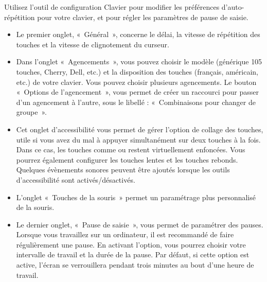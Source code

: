 {}
Utilisez l'outil de configuration Clavier pour modifier les préférences d'auto-répétition pour votre clavier, et pour régler les paramètres de pause de saisie.
\begin{itemize}
\item Le premier onglet, «~Général~», concerne le délai, la vitesse de répétition des touches et la vitesse de clignotement du curseur.
\item Dans l'onglet «~Agencements~», vous pouvez choisir le modèle (générique 105 touches, Cherry, Dell, etc.) et la disposition des touches (français, américain, etc.) de votre clavier. Vous pouvez choisir plusieurs agencements. Le bouton «~Options de l'agencement~», vous permet de créer un raccourci pour passer d'un agencement à l'autre, sous le libellé : «~Combinaisons pour changer de groupe~».
\item Cet onglet d'accessibilité vous permet de gérer l'option de collage des touches, utile si vous avez du mal à appuyer simultanément sur deux touches à la fois. Dans ce cas, les touches comme  ou  restent virtuellement enfoncées. Vous pourrez également configurer les touches lentes et les touches rebonds. Quelques évènements sonores peuvent être ajoutés lorsque les outils d'accessibilité sont activés/désactivés.
\item L'onglet «~Touches de la souris~» permet un paramétrage plus personnalisé de la souris. 
\item Le dernier onglet, «~Pause de saisie~», vous permet de paramétrer des pauses. Lorsque vous travaillez sur un ordinateur, il est recommandé de faire régulièrement une pause. En activant l'option, vous pourrez choisir votre intervalle de travail et la durée de la pause. Par défaut, si cette option est active, l'écran se verrouillera pendant trois minutes au bout d'une heure de travail.
\end{itemize}\par
